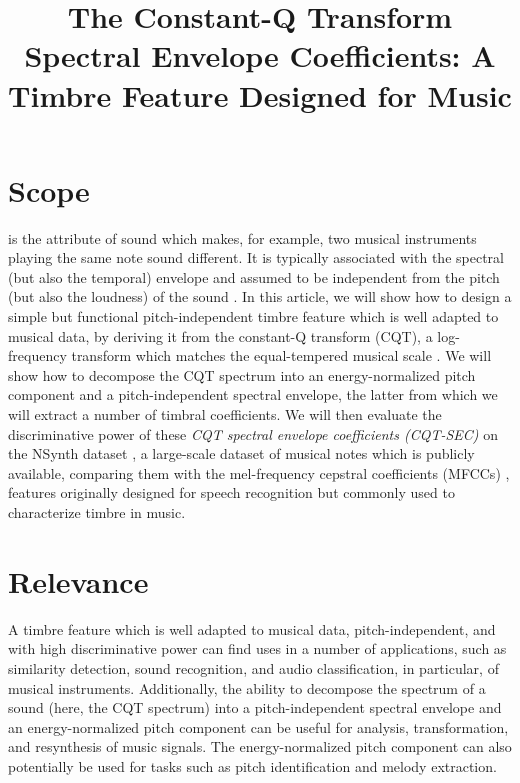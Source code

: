 \documentclass[journal]{IEEEtran}
\begin{document}
\title{The Constant-Q Transform Spectral Envelope Coefficients: A Timbre Feature Designed for Music}

\maketitle

\section{Scope}

 is the attribute of sound which makes, for example, two musical instruments playing the same note sound different. It is typically associated with the spectral (but also the temporal) envelope and assumed to be independent from the pitch (but also the loudness) of the sound \cite{moore2004}. In this article, we will show how to design a simple but functional pitch-independent timbre feature which is well adapted to musical data, by deriving it from the constant-Q transform (CQT), a log-frequency transform which matches the equal-tempered musical scale \cite{brown1991, brown1992}. We will show how to decompose the CQT spectrum into an energy-normalized pitch component and a pitch-independent spectral envelope, the latter from which we will extract a number of timbral coefficients. We will then evaluate the discriminative power of these \textit{CQT spectral envelope coefficients (CQT-SEC)} on the NSynth dataset \cite{engel2017}, a large-scale dataset of musical notes which is publicly available, comparing them with the mel-frequency cepstral coefficients (MFCCs) \cite{mermelstein1976}, features originally designed for speech recognition but commonly used to characterize timbre in music. 


\section{Relevance}

A timbre feature which is well adapted to musical data, pitch-independent, and with high discriminative power can find uses in a number of applications, such as similarity detection, sound recognition, and audio classification, in particular, of musical instruments. Additionally, the ability to decompose the spectrum of a sound (here, the CQT spectrum) into a pitch-independent spectral envelope and an energy-normalized pitch component can be useful for analysis, transformation, and resynthesis of music signals. The energy-normalized pitch component can also potentially be used for tasks such as pitch identification and melody extraction.
\end{document}
